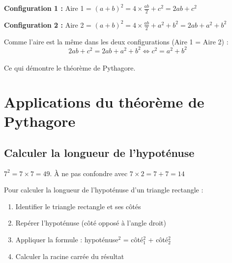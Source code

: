 \textbf{Configuration 1 :} Aire 1 = $(a+b)^2 = 4 \times \frac{ab}{2} + c^2 = 2ab + c^2$

\textbf{Configuration 2 :} Aire 2 = $(a+b)^2 = 4 \times \frac{ab}{2} + a^2 + b^2 = 2ab + a^2 + b^2$

Comme l'aire est la même dans les deux configurations (Aire 1 = Aire 2) :
$$2ab + c^2 = 2ab + a^2 + b^2 \Leftrightarrow c^2 = a^2 + b^2$$ \\
Ce qui démontre le théorème de Pythagore.

\section{Applications du théorème de Pythagore}

\subsection{Calculer la longueur de l'hypoténuse}

\begin{remarkbox}[Important]
$7^2 = 7 \times 7 = 49$. À ne pas confondre avec $7 \times 2 = 7 + 7 = 14$
\end{remarkbox}

\begin{methodebox}
Pour calculer la longueur de l'hypoténuse d'un triangle rectangle :
\begin{enumerate}
    \item Identifier le triangle rectangle et ses côtés
    \item Repérer l'hypoténuse (côté opposé à l'angle droit)
    \item Appliquer la formule : hypoténuse$^2$ = côté$_1^2$ + côté$_2^2$
    \item Calculer la racine carrée du résultat
\end{enumerate}
\end{methodebox}

